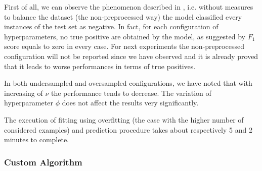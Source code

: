 \documentclass[12pt]{article}
\begin{document}
First of all, we can observe the phenomenon described in \cite{ClassImbalanceProblem}, i.e. without measures to balance the dataset (the non-preprocessed way) the model classified every instances of the test set as negative.
In fact, for each configuration of hyperparameters, no true positive are obtained by the model, as suggested by $F_1$ score equals to zero in every case.
For next experiments the non-preprocessed configuration will not be reported since we have observed and it is already proved \cite{ClassImbalanceProblem} that it leads to worse performances in terms of true positives.

In both undersampled and oversampled configurations, we have noted that with increasing of $\nu$ the performance tends to decrease. The variation of hyperparameter $\phi$ does not affect the results very significantly.


The execution of fitting using overfitting (the case with the higher number of considered examples) and prediction procedure takes about respectively 5 and 2 minutes to complete.





\subsubsection{Custom Algorithm}
\end{document}
